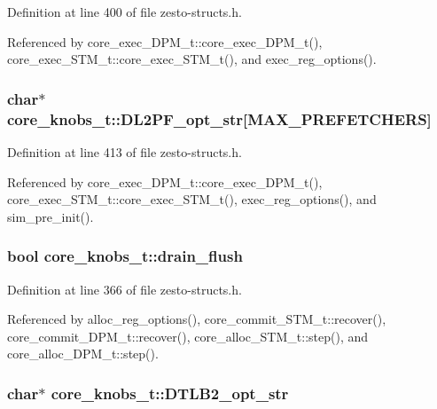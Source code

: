 Definition at line 400 of file zesto-structs.h.

Referenced by core\_\-exec\_\-DPM\_\-t::core\_\-exec\_\-DPM\_\-t(), core\_\-exec\_\-STM\_\-t::core\_\-exec\_\-STM\_\-t(), and exec\_\-reg\_\-options().
\subsubsection[{DL2PF\_\-opt\_\-str}]{\setlength{\rightskip}{0pt plus 5cm}char$\ast$ {\bf core\_\-knobs\_\-t::DL2PF\_\-opt\_\-str}[MAX\_\-PREFETCHERS]}\label{structcore__knobs__t_992e7058ad0a77e99b9e454d67d48c16}




Definition at line 413 of file zesto-structs.h.

Referenced by core\_\-exec\_\-DPM\_\-t::core\_\-exec\_\-DPM\_\-t(), core\_\-exec\_\-STM\_\-t::core\_\-exec\_\-STM\_\-t(), exec\_\-reg\_\-options(), and sim\_\-pre\_\-init().
\subsubsection[{drain\_\-flush}]{\setlength{\rightskip}{0pt plus 5cm}bool {\bf core\_\-knobs\_\-t::drain\_\-flush}}\label{structcore__knobs__t_e660d28db7f277e66f88c1560fd9da62}




Definition at line 366 of file zesto-structs.h.

Referenced by alloc\_\-reg\_\-options(), core\_\-commit\_\-STM\_\-t::recover(), core\_\-commit\_\-DPM\_\-t::recover(), core\_\-alloc\_\-STM\_\-t::step(), and core\_\-alloc\_\-DPM\_\-t::step().
\subsubsection[{DTLB2\_\-opt\_\-str}]{\setlength{\rightskip}{0pt plus 5cm}char$\ast$ {\bf core\_\-knobs\_\-t::DTLB2\_\-opt\_\-str}}\label{structcore__knobs__t_da62853f63953881b5459167a9c5737b}




